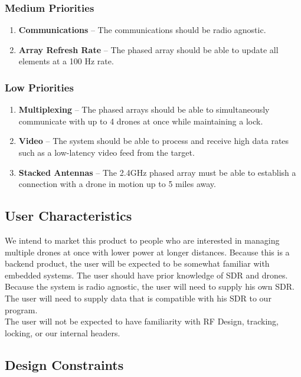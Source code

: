 \documentclass[ProjectRequirements.tex]{subfiles}
\begin{document}
		\subsubsection{Medium Priorities}
			\begin{enumerate}
				\item \textbf{Communications} -- The communications should be radio agnostic.
				\item \textbf{Array Refresh Rate} -- The phased array should be able to update all elements at a 100 Hz rate.
			\end{enumerate}
		
		\subsubsection{Low Priorities}
			\begin{enumerate}
				\item \textbf{Multiplexing} -- The phased arrays should be able to simultaneously communicate with up to 4 drones at once while maintaining a lock.
				\item \textbf{Video} -- The system should be able to process and receive high data rates such as a low-latency video feed from the target.
				\item \textbf{Stacked Antennas} -- The 2.4GHz phased array must be able to establish a connection with a drone in motion up to 5 miles away.
			\end{enumerate}
		
	\subsection{User Characteristics}
		We intend to market this product to people who are interested in managing multiple drones at once with lower power at longer distances. Because this is a backend product, the user will be expected to be somewhat familiar with embedded systems. The user should have prior knowledge of SDR and drones. Because the system is radio agnostic, the user will need to supply his own SDR. The user will need to supply data that is compatible with his SDR to our program.\\
		
		The user will not be expected to have familiarity with RF Design, tracking, locking, or our internal headers.
		
	\subsection{Design Constraints}
\end{document}
